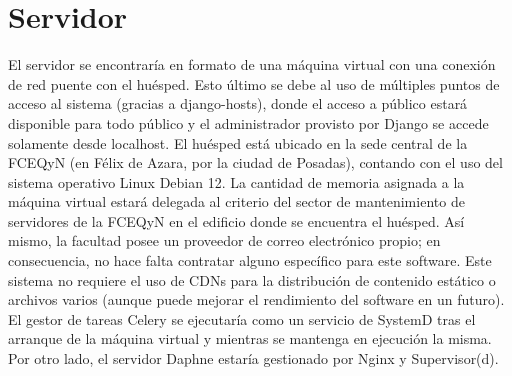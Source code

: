 \section{Servidor}
\normalsize{\indent
El servidor se encontrar\'ia en formato
de una m\'aquina virtual con una conexi\'on
de red puente con el hu\'esped. Esto
\'ultimo se debe al uso de m\'ultiples
puntos de acceso al sistema (gracias a
django-hosts), donde el acceso a p\'ublico
estar\'a disponible para todo p\'ublico y
el administrador provisto por Django se
accede solamente desde localhost.
}
\newline
\normalsize{\indent
El hu\'esped est\'a ubicado en la sede
central de la FCEQyN (en F\'elix de Azara,
por la ciudad de Posadas), contando
con el uso del sistema operativo Linux
Debian 12.
}
\newline
\normalsize{\indent
La cantidad de memoria asignada a la
m\'aquina virtual estar\'a delegada al
criterio del sector de mantenimiento de
servidores de la FCEQyN en el edificio
donde se encuentra el hu\'esped.
As\'i mismo, la facultad posee un proveedor
de correo electr\'onico propio; en
consecuencia, no hace falta contratar
alguno espec\'ifico para este software.
}
\newline
\normalsize{\indent
Este sistema no requiere el uso de
CDNs para la distribuci\'on de contenido
est\'atico o archivos varios (aunque
puede mejorar el rendimiento del software
en un futuro).
}
\newline
\normalsize{\indent
El gestor de tareas Celery se ejecutar\'ia
como un servicio de SystemD tras el
arranque de la m\'aquina virtual y
mientras se mantenga en ejecuci\'on la
misma. Por otro lado, el servidor Daphne
estar\'ia gestionado por Nginx y
Supervisor(d).
}